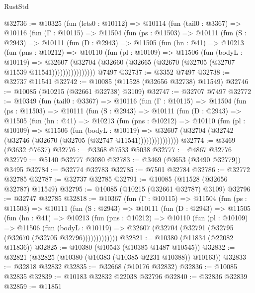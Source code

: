 \begin{lexlean}{RustStd}
\begin{coremodule}
@32736 := @10325
    (fun (lets0 : @10112) =>
    @10114
      (fun (tail0 : @3367) =>
      @10116
        (fun (Γ : @10115) =>
        @11504
          (fun (ps : @11503) =>
          @10111
            (fun (S : @2943) =>
            @10111
              (fun (D : @2943) =>
              @11505
                (fun (hn : @41) =>
                @10213
                  (fun (pns : @10212) =>
                  @10110
                    (fun (pl : @10109) =>
                    @11506
                      (fun (bodyL : @10119) =>
                      @32607
                        (@32704
                          (@32660 (@32665 (@32670 (@32705 (@32707 @11539 @11541))))))))))))))))
    @7497
@32737 := @3352 @7497
@32738 := @32737 @11541
@32742 := @10085 (@11528 (@32656 @32738) @11549)
@32746 := @10085 (@10215 (@32661 @32738) @3109)
@32747 := @32707 @7497
@32772 := @10349
    (fun (tail0 : @3367) =>
    @10116
      (fun (Γ : @10115) =>
      @11504
        (fun (ps : @11503) =>
        @10111
          (fun (S : @2943) =>
          @10111
            (fun (D : @2943) =>
            @11505
              (fun (hn : @41) =>
              @10213
                (fun (pns : @10212) =>
                @10110
                  (fun (pl : @10109) =>
                  @11506
                    (fun (bodyL : @10119) =>
                    @32607 (@32704 (@32742 (@32746 (@32670 (@32705 (@32747 @11541)))))))))))))))
@32774 := @3469 (@3632 @7637)
@32776 := @3368 @7533 @5038
@32777 := @4867 @32776
@32779 := @5140 @32777 @3080
@32783 := @3469 (@3653 (@3490 @32779)) @3495
@32784 := @32774 @32783
@32785 := @7501 @32784
@32786 := @32772 @32785
@32787 := @32737 @32785
@32791 := @10085 (@11528 (@32656 @32787) @11549)
@32795 := @10085 (@10215 (@32661 @32787) @3109)
@32796 := @32747 @32785
@32818 := @10367
    (fun (Γ : @10115) =>
    @11504
      (fun (ps : @11503) =>
      @10111
        (fun (S : @2943) =>
        @10111
          (fun (D : @2943) =>
          @11505
            (fun (hn : @41) =>
            @10213
              (fun (pns : @10212) =>
              @10110
                (fun (pl : @10109) =>
                @11506
                  (fun (bodyL : @10119) =>
                  @32607 (@32704 (@32791 (@32795 (@32670 (@32705 @32796)))))))))))))
@32821 := @10380 (@11834 (@22082 @11836))
@32825 := @10380 (@10543 (@10385 @1487 @10545))
@32832 := @32821 (@32825 (@10380 (@10383 (@10385 @2231 @10388)) @10163))
@32833 := @32818 @32832
@32835 := @32668 (@10176 @32832)
@32836 := @10085 @32835
@32839 := @10183 @32832 @22038 @32796
@32840 := @32836 @32839
@32859 := @11851

\end{coremodule}
\end{lexlean}
